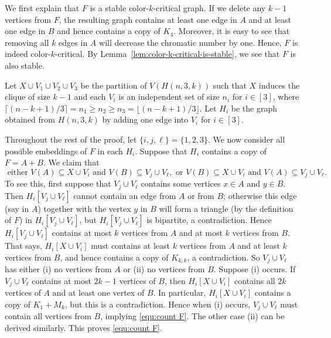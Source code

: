 \documentclass[10pt]{article}
\begin{document}
We first explain that $F$ is a stable color-$k$-critical graph.
If we delete any $k-1$ vertices from $F$,
the resulting graph contains at least one edge in $A$ and at least one edge in $B$ and hence contains a copy of $K_4$.
Moreover, it is easy to see that removing all $k$ edges in $A$ will decrease the chromatic number by one.
Hence, $F$ is indeed color-$k$-critical.
By Lemma~\ref{lem:color-k-critical-is-stable}, we see that $F$ is also stable.

Let $X\cup V_1\cup V_2\cup V_3$ be the partition of $V(H(n,3,k))$ such that $X$ induces the clique of size $k-1$ and each $V_i$ is an independent set of size $n_i$ for $i\in [3]$,
where $\lceil(n-k+1)/3\rceil= n_1\geq n_2\geq n_3=\lfloor(n-k+1)/3\rfloor$.
Let $H_i$ be the graph obtained from $H(n,3,k)$ by adding one edge into $V_i$ for $i\in [3]$.

Throughout the rest of the proof, let $\{i,j,\ell\}=\{1,2,3\}$.
We now consider all possible embeddings of $F$ in each $H_i$.
Suppose that $H_i$ contains a copy of $F=A+B$.
We claim that
\begin{equation}\label{equ:count F}
\mbox{ either } V(A)\subseteq X\cup V_i \mbox{ and } V(B) \subseteq V_j\cup V_\ell, \mbox{ or } V(B)\subseteq X\cup V_i \mbox{ and } V(A) \subseteq V_j\cup V_\ell.
\end{equation}
To see this, first suppose that $V_j\cup V_\ell$ contains some vertices $x\in A$ and $y\in B$.
Then $H_i[V_j\cup V_\ell]$ cannot contain an edge from $A$ or from $B$;
otherwise this edge (say in $A$) together with the vertex $y$ in $B$ will form a triangle (by the definition of $F$) in $H_i[V_j\cup V_\ell]$, but $H_i[V_j\cup V_\ell]$ is bipartite, a contradiction.
Hence $H_i[V_j\cup V_\ell]$ contains at most $k$ vertices from $A$ and at most $k$ vertices from $B$.
That says, $H_i[X\cup V_i]$ must contains at least $k$ vertices from $A$ and at least $k$ vertices from $B$, and hence contains a copy of $K_{k,k}$, a contradiction.
So $V_j\cup V_\ell$ has either (i) no vertices from $A$ or (ii) no vertices from $B$.
Suppose (i) occurs.
If $V_j\cup V_\ell$ contains at most $2k-1$ vertices of $B$, then $H_i[X\cup V_i]$ contains all $2k$ vertices of $A$ and at least one vertex of $B$.
In particular, $H_i[X\cup V_i]$ contains a copy of $K_1+M_k$, but this is a contradiction.
Hence when (i) occurs, $V_j\cup V_\ell$ must contain all vertices from $B$, implying \eqref{equ:count F}.
The other case (ii) can be derived similarly. This proves \eqref{equ:count F}.
\end{document}
